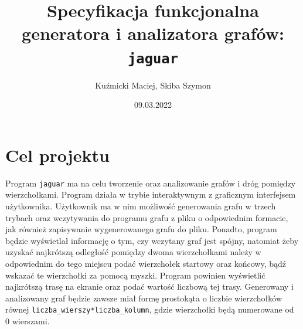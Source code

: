 \documentclass[]{article}
\title{Specyfikacja funkcjonalna generatora i analizatora grafów: \texttt{jaguar}}
\author{Kuźmicki Maciej, Skiba Szymon}
\date{09.03.2022}
\begin{document}
\maketitle
\thispagestyle{fancy}
\section{Cel projektu}\label{header-n231}
Program \texttt{jaguar} ma na celu tworzenie oraz analizowanie grafów i dróg pomiędzy wierzchołkami. 
Program działa w trybie interaktywnym z graficznym interfejsem użytkownika. Użytkownik ma w nim możliwość generowania grafu w trzech trybach oraz wczytywania do programu grafu z pliku o odpowiednim formacie, jak również zapisywanie wygenerowanego grafu do pliku. Ponadto, program będzie wyświetlał informację o tym, czy wczytany graf jest spójny, natomiat żeby uzyskać najkrótszą odległość pomiędzy dwoma wierzchołkami należy w odpowiednim do tego miejscu podać wierzchołek startowy oraz końcowy, bądź wskazać te wierzchołki za pomocą myszki. Program powinien wyświetlić najkrótszą trasę na ekranie oraz podać wartość liczbową tej trasy. Generowany i analizowany graf będzie zawsze miał formę prostokąta o liczbie wierzchołków równej \verb|liczba_wierszy*liczba_kolumn|,  gdzie wierzchołki będą numerowane od 0 wierszami.
\end{document}
